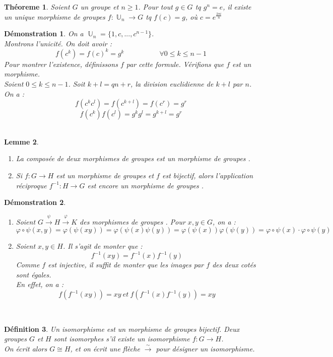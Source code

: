 \documentclass[a4paper, oneside]{report}
\theoremstyle{break}
\newtheorem{thm}{Théoreme}[section] %
\newtheorem{defi}[thm]{Définition}
\newtheorem{lemme}[thm]{Lemme}
\newtheorem*{demo}{Démonstration}
\newcommand{\mdg}{morphisme de groupes }
\newcommand{\mdgs}{morphismes de groupes }
\newcommand{\fong}{\overset{\sim}{\rightarrow}}
\DeclareMathOperator{\U}{\mathbb{U}}
\begin{document}
\begin{thm}
	Soient $G$ un groupe et $n\geq 1$. Pour tout $g\in G$ tq $g^n=e$, il existe un unique \mdg $f:\U_n \rightarrow G$ tq $f(c)=g$, où $c=e^{\frac{2\pi i}{n}}$
\end{thm}

\begin{demo}
	On a $\U_n = \{1,c,...,c^{n-1}\}$.\\
	Montrons l'unicité. On doit avoir :
	$$f(c^k)=f(c)^k=g^k\hspace{5em}\forall 0\leq k \leq n-1$$
	Pour montrer l'existence, définissons $f$ par cette formule. Vérifions que $f$ est un morphisme.\\
	Soient $0\leq k\leq n-1$. Soit $k+l=qn+r$, la division euclidienne de $k+l$ par $n$. On a :
	$$f(c^kc^l)= f(c^{k+l})=f(c^r)=g^r$$
	$$f(c^k)f(c^l)=g^kg^l=g^{k+l}=g^r$$
~
\end{demo}

\begin{lemme}
	\begin{enumerate}
		\item La composée de deux \mdgs est un \mdg.
		\item Si $f:G\rightarrow H$ est un \mdg et $f$ est bijectif, alors l'application réciproque $f^{-1}:H\rightarrow G$ est encore un \mdg.
	\end{enumerate}
\end{lemme}

\begin{demo}
	\begin{enumerate}
		\item Soient $G\overset{\psi}{\rightarrow} H \overset{\varphi}{\rightarrow} K$ des \mdgs. Pour $x,y\in G$, on a :
		$$\varphi\circ \psi (x,y)=\varphi (\psi (xy))=\varphi (\psi(x)\psi(y)) = \varphi(\psi (x))\varphi(\psi(y))=\varphi\circ \psi(x)\cdot \varphi \circ \psi(y)$$
		\item Soient $x,y\in H$. Il s'agit de monter que :
		$$f^{-1}(xy)=f^{-1}(x)f^{-1}(y)$$
		Comme $f$ est injective, il suffit de monter que les images par $f$ des deux cotés sont égales.\\
		En effet, on a :
		$$f(f^{-1}(xy))=xy~et~f(f^{-1}(x)f^{-1}(y))=xy$$
	\end{enumerate}
~
\end{demo}

\begin{defi}
	Un isomorphisme est un \mdg bijectif. Deux groupes $G$ et $H$ sont isomorphes s'il existe un isomorphisme $f:G\rightarrow H$.\\
	On écrit alors $G\cong H$, et on écrit une flèche $\fong$ pour désigner un isomorphisme.
\end{defi}
\end{document}
